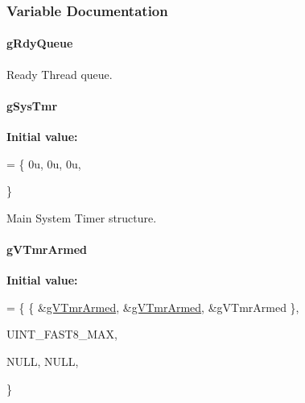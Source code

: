 \subsubsection{Variable Documentation}
\hypertarget{group__kern__impl_ga185694d8732651c7426a7d1dbd2d6bb8}{
\paragraph[{g\-Rdy\-Queue}]{ g\-Rdy\-Queue\hspace{0.3cm}{\ttfamily [static]}}}\label{group__kern__impl_ga185694d8732651c7426a7d1dbd2d6bb8}


Ready Thread queue. 

\hypertarget{group__kern__impl_ga7cf5c5d1e8a2f1ccf59d65bc409d82c3}{
\paragraph[{g\-Sys\-Tmr}]{ g\-Sys\-Tmr\hspace{0.3cm}{\ttfamily [static]}}}\label{group__kern__impl_ga7cf5c5d1e8a2f1ccf59d65bc409d82c3}
{\bfseries Initial value\-:}
\begin{DoxyCode}
= \{
    0u,
    0u,
    0u,



\}
\end{DoxyCode}


Main System Timer structure. 

\hypertarget{group__kern__impl_ga69378b000a004da276419e5a394faaca}{
\paragraph[{g\-V\-Tmr\-Armed}]{ g\-V\-Tmr\-Armed\hspace{0.3cm}{\ttfamily [static]}}}\label{group__kern__impl_ga69378b000a004da276419e5a394faaca}
{\bfseries Initial value\-:}
\begin{DoxyCode}
= \{
   \{    &\hyperlink{group__kern__impl_ga69378b000a004da276419e5a394faaca}{gVTmrArmed},
        &\hyperlink{group__kern__impl_ga69378b000a004da276419e5a394faaca}{gVTmrArmed},
        &gVTmrArmed
   \},


   UINT\_FAST8\_MAX,





   NULL,
   NULL,



\}
\end{DoxyCode}


